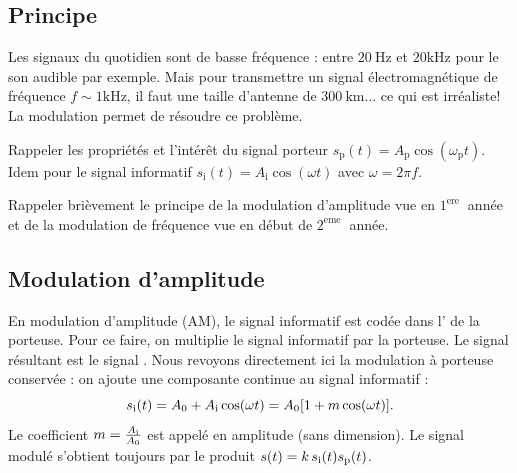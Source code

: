\subsection{Principe}
\label{sec:théorie}
Les signaux du quotidien sont de basse fréquence : entre $20 \mathrm{~Hz}$ et $20 \mathrm{kHz}$ pour le son audible par exemple. Mais pour transmettre un signal électromagnétique de fréquence $f \sim 1 \mathrm{kHz}$, il faut une taille d'antenne de $300 \mathrm{~km}$... ce qui est irréaliste! La modulation permet de résoudre ce problème.
\begin{protocole}
  \item 
  Rappeler les propriétés et l'intérêt du signal porteur $s_{\mathrm{p}}(t)=A_{\mathrm{p}} \cos \left(\omega_{\mathrm{p}} t\right)$. Idem pour le signal informatif $s_{\mathrm{i}}(t)=A_{\mathrm{i}} \cos (\omega t)$ avec $\omega=2 \pi f$.
  \item Rappeler brièvement le principe de la modulation d'amplitude vue en $1^{\text {ere }}$ année et de la modulation de fréquence vue en début de $2^{\text {eme }}$ année.
\end{protocole}

\subsection{Modulation d'amplitude}
En modulation d'amplitude (AM), le signal informatif est codée dans l' de la porteuse.
 Pour ce faire, on multiplie le signal informatif par la porteuse. Le signal résultant est le signal . Nous revoyons directement ici la modulation à porteuse conservée : on ajoute une composante continue au signal informatif :
\begin{equation}
s_{\rm{i}}(t)=A_0+A_{\rm{i}}\cos(\omega t)=A_0[1+m\cos(\omega t)].
\end{equation}
Le coefficient $m=\frac{A_{\rm{i}}}{A_0}$ est appelé  en amplitude (sans dimension). Le signal modulé s'obtient toujours par le produit $ s(t) = k \, s_{\rm{i}}(t)s_{\rm{p}}(t)$.


